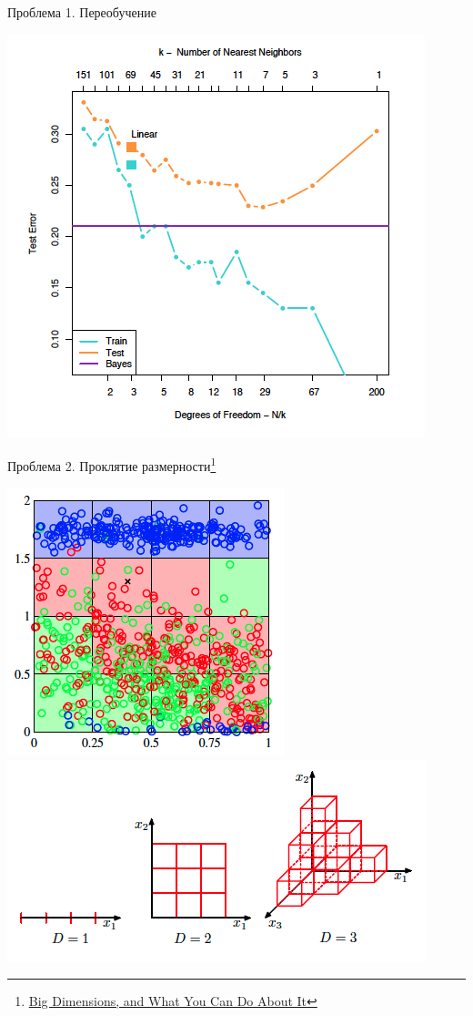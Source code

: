 \documentclass[aspectratio=169]{beamer}
\begin{document}
\begin{frame}{Проблема 1. Переобучение}
\begin{center}
\includegraphics[scale=0.3]{images/knn_tt.png}

\end{center}

\end{frame}

\begin{frame}{Проблема 2. Проклятие размерности\footnote{\href{http://jeremykun.com/2016/02/08/big-dimensions-and-what-you-can-do-about-it/}{Big Dimensions, and What You Can Do About It}}}

\begin{center}
\includegraphics[scale=0.3]{images/pts.png}
\includegraphics[scale=0.4]{images/curse.png}
\end{center}

\end{frame}
\end{document}
